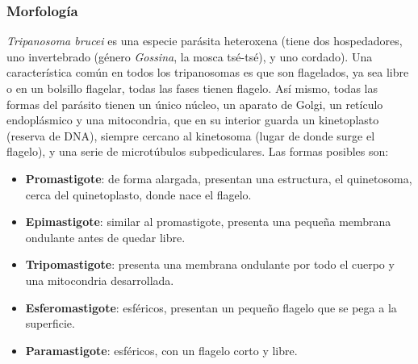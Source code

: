 \subsubsection{Morfología}
\textit{Tripanosoma brucei} es una especie parásita heteroxena (tiene dos hospedadores, uno invertebrado (género \textit{Gossina}, la mosca tsé-tsé), y uno cordado). Una característica común en todos los tripanosomas es que son flagelados, ya sea libre o en un bolsillo flagelar, todas las fases tienen flagelo. Así mismo, todas las formas del parásito tienen un único núcleo, un aparato de Golgi, un retículo endoplásmico y una mitocondria, que en su interior guarda un kinetoplasto (reserva de DNA), siempre cercano al kinetosoma (lugar de donde surge el flagelo), y una serie de microtúbulos subpediculares. Las formas posibles son:
\begin{itemize}[itemsep=0pt,parsep=0pt,topsep=0pt,partopsep=0pt]
	\item \textbf{Promastigote}: de forma alargada, presentan una estructura, el quinetosoma, cerca del quinetoplasto, donde nace el flagelo.
	\item \textbf{Epimastigote}: similar al promastigote, presenta una pequeña membrana ondulante antes de quedar libre.
	\item \textbf{Tripomastigote}: presenta una membrana ondulante por todo el cuerpo y una mitocondria desarrollada.
	\item \textbf{Esferomastigote}: esféricos, presentan un pequeño flagelo que se pega a la superficie.
	\item \textbf{Paramastigote}: esféricos, con un flagelo corto y libre.
\end{itemize}

